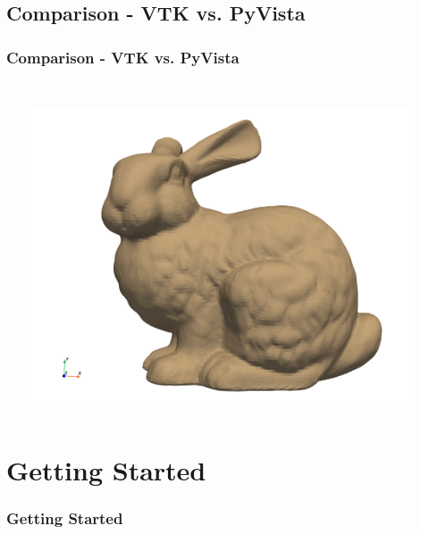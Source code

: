 \documentclass[t]{beamer}
\begin{document}
\subsection{Comparison - VTK vs. PyVista}
\begin{frame}
  \frametitle{Comparison - VTK vs. PyVista}
  \begin{columns}[T]
    \begin{column}{.5\textwidth}
      \vspace{-15pt}
      \inputminted[fontsize=\footnotesize]{python}{code/vtk_example.py}
    \end{column}

    \begin{column}{.5\textwidth}
      \vspace{-15pt}
      \inputminted[fontsize=\footnotesize]{python}{code/pv_example.py}
      \begin{center}
        \includegraphics[width=0.9\textwidth]{figures/pv_example.png}
        \end{center}
    \end{column}
  \end{columns}

\end{frame}


\section{Getting Started}

\begin{frame}
  \frametitle{Getting Started}
  \tableofcontents[currentsection]
  \vspace{200pt}  %
\end{frame}
\end{document}
